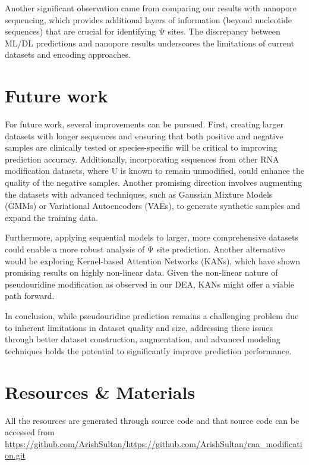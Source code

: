 \documentclass[12pt]{book}
\begin{document}
    Another significant observation came from comparing our results with nanopore sequencing, which provides additional layers of information (beyond nucleotide sequences) that are crucial for identifying Ψ sites. The discrepancy between ML/DL predictions and nanopore results underscores the limitations of current datasets and encoding approaches.


    \section{Future work}\label{sec:future-work}

      For future work, several improvements can be pursued. First, creating larger datasets with longer sequences and ensuring that both positive and negative samples are clinically tested or species-specific will be critical to improving prediction accuracy. Additionally, incorporating sequences from other RNA modification datasets, where U is known to remain unmodified, could enhance the quality of the negative samples. Another promising direction involves augmenting the datasets with advanced techniques, such as Gaussian Mixture Models (GMMs) or Variational Autoencoders (VAEs), to generate synthetic samples and expand the training data.

      Furthermore, applying sequential models to larger, more comprehensive datasets could enable a more robust analysis of Ψ site prediction. Another alternative would be exploring Kernel-based Attention Networks (KANs), which have shown promising results on highly non-linear data. Given the non-linear nature of pseudouridine modification as observed in our DEA, KANs might offer a viable path forward.

      In conclusion, while pseudouridine prediction remains a challenging problem due to inherent limitations in dataset quality and size, addressing these issues through better dataset construction, augmentation, and advanced modeling techniques holds the potential to significantly improve prediction performance.


    \section{Resources \& Materials}\label{sec:resources-&-materials}
      All the resources are generated through source code and that source code can be accessed from \url{https://github.com/ArishSultan/https://github.com/ArishSultan/rna_modification.git}


      
\end{document}
